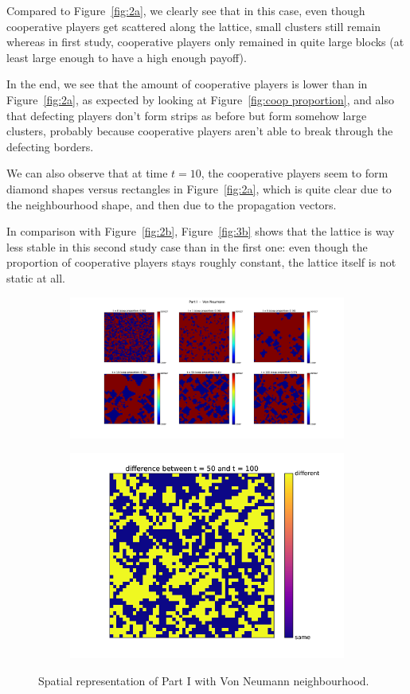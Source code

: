 \documentclass{article}
\begin{document}
Compared to Figure~\ref{fig:2a}, we clearly see that in this case, even though cooperative players get
scattered along the lattice, small clusters still remain whereas in first study, cooperative players only
remained in quite large blocks (at least large enough to have a high enough payoff).

In the end, we see that the amount of cooperative players is lower than in Figure~\ref{fig:2a}, as expected
by looking at Figure~\ref{fig:coop proportion}, and also that defecting players don't form strips as before
but form somehow large clusters, probably because cooperative players aren't able to break through the
defecting borders.

We can also observe that at time $t=10$, the cooperative players seem to form diamond shapes versus rectangles
in Figure~\ref{fig:2a}, which is quite clear due to the neighbourhood shape, and then due to the propagation
vectors.

In comparison with Figure~\ref{fig:2b}, Figure~\ref{fig:3b} shows that the lattice is way less stable in this
second study case than in the first one: even though the proportion of cooperative players stays roughly
constant, the lattice itself is not static at all.

\begin{figure}%
		\begin{subfigure}{\textwidth}
		\hspace{-2.5cm}
		\vspace{-.5cm}
		\includegraphics[width=1.25\textwidth]{imgs/part1_VN_periods.png}
	\end{subfigure}
	\begin{subfigure}{\textwidth}
		\centering
		\includegraphics[width=.4\textwidth]{imgs/part1_VN_periods_difference.png}
	\end{subfigure}
	\caption{Spatial representation of Part I with Von Neumann neighbourhood.\label{fig:Spatial Representation Part I VN}}
\end{figure}
\end{document}
